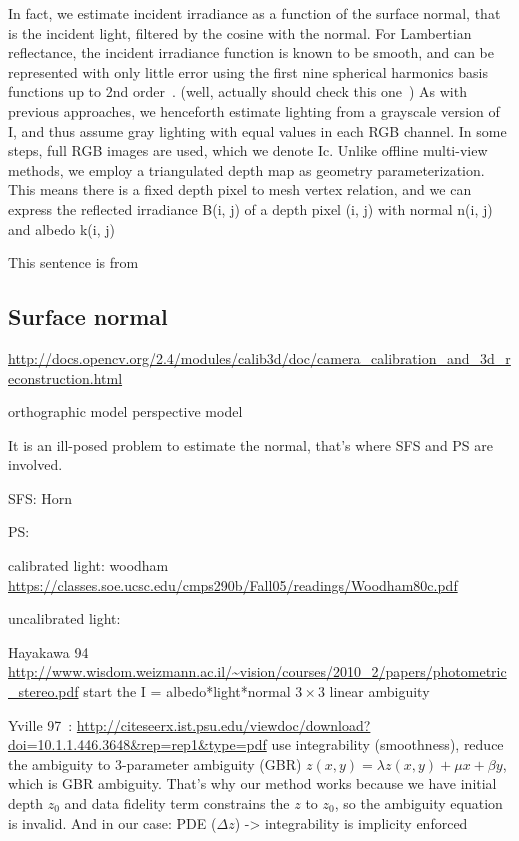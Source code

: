 In fact, we estimate incident irradiance as a function of the surface normal, that is the incident light, filtered by the cosine with the normal. For Lambertian reflectance, the incident irradiance function is known to be smooth, and can be represented with only little error using the first nine spherical harmonics basis functions up to 2nd order~\cite{ramamoorthi2001efficient}. (well, actually should check this one~\cite{ramamoorthi2001relationship})
As with previous approaches, we henceforth estimate lighting from a grayscale version of I, and thus assume gray lighting with equal values in each RGB channel. In some steps, full RGB images are used, which we denote Ic. Unlike offline multi-view methods, we employ a triangulated depth map as geometry parameterization. This means there is a fixed depth pixel to mesh vertex relation, and we can express the reflected irradiance B(i, j) of a depth pixel (i, j) with normal n(i, j) and albedo k(i, j)

This sentence is from\cite{wu2014real}


\subsection{Surface normal}
\url{http://docs.opencv.org/2.4/modules/calib3d/doc/camera_calibration_and_3d_reconstruction.html}

orthographic model
perspective model

It is an ill-posed problem to estimate the normal, that's where SFS and PS are involved. 

SFS:
Horn

PS:

calibrated light: woodham~\cite{woodham1980photometric} \url{https://classes.soe.ucsc.edu/cmps290b/Fall05/readings/Woodham80c.pdf}

uncalibrated light:

Hayakawa 94~\cite{hayakawa1994photometric} \url{http://www.wisdom.weizmann.ac.il/~vision/courses/2010_2/papers/photometric_stereo.pdf}
start the I = albedo*light*normal $3\times3$ linear ambiguity

Yville 97~\cite{yuille1997shape}: \url{http://citeseerx.ist.psu.edu/viewdoc/download?doi=10.1.1.446.3648&rep=rep1&type=pdf}
use integrability (smoothness), reduce the ambiguity to 3-parameter ambiguity (GBR)
$z(x,y) = \lambda z(x,y) + \mu x + \beta y$, which is GBR ambiguity. That's why our method works because we have initial depth $z_0$ and data fidelity term constrains the $z$ to $z_0$, so the ambiguity equation is invalid. 
And in our case: PDE ($\Delta z$) -> integrability is implicity enforced


